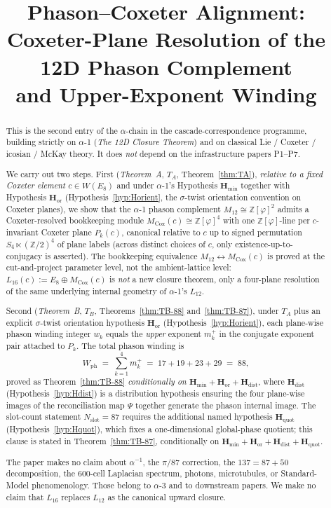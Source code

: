 \documentclass[11pt, a4paper]{amsart}
\title{Phason--Coxeter Alignment:\\
  Coxeter-Plane Resolution of the 12D Phason Complement\\
  and Upper-Exponent Winding}
\author{}
\date{}
\theoremstyle{definition}
\newcommand{\Z}{\mathbb{Z}}
\newcommand{\Hmin}{\mathbf{H}_{\min}}
\newcommand{\Hor}{\mathbf{H}_{\mathrm{or}}}
\newcommand{\Hdist}{\mathbf{H}_{\mathrm{dist}}}
\newcommand{\Hquot}{\mathbf{H}_{\mathrm{quot}}}
\newcommand{\Ophi}{\mathbb{Z}[\varphi]}
\newcommand{\Mcox}{M_{\mathrm{Cox}}}
\newcommand{\Mtw}{M_{12}}
\newcommand{\Wph}{W_{\mathrm{ph}}}
\newcommand{\Nslot}{N_{\mathrm{slot}}}
\begin{document}
\maketitle

\begin{abstract}
This is the second entry of the $\alpha$-chain in the
cascade-correspondence programme, building strictly on
$\alpha$-1 (\emph{The 12D Closure Theorem}) and on classical
Lie / Coxeter / icosian / McKay theory. It does \emph{not}
depend on the infrastructure papers P1--P7.

We carry out two steps. First (\emph{Theorem~A}, $T_A$,
Theorem~\ref{thm:TA}), \emph{relative to a fixed Coxeter
element $c \in W(E_8)$} and under $\alpha$-1's Hypothesis
$\Hmin$ together with Hypothesis $\Hor$
(Hypothesis~\ref{hyp:Horient}, the $\sigma$-twist
orientation convention on Coxeter planes), we show that
the $\alpha$-1 phason complement $\Mtw \cong \Ophi^{2}$
admits a Coxeter-resolved bookkeeping module $\Mcox(c)
\cong \Ophi^{4}$ with one $\Ophi$-line per
$c$-invariant Coxeter plane $P_k(c)$, canonical relative
to $c$ up to signed permutation $S_4 \ltimes (\Z/2)^4$
of plane labels (across distinct choices of $c$, only
existence-up-to-conjugacy is asserted). The bookkeeping
equivalence $\Mtw \leftrightarrow \Mcox(c)$ is proved at
the cut-and-project parameter level, not the
ambient-lattice level: $L_{16}(c) := E_8 \oplus \Mcox(c)$
is \emph{not} a new closure theorem, only a four-plane
resolution of the same underlying internal geometry of
$\alpha$-1's $L_{12}$.

Second (\emph{Theorem~B}, $T_B$, Theorems~\ref{thm:TB-88}
and~\ref{thm:TB-87}), under $T_A$ plus an explicit
$\sigma$-twist orientation hypothesis $\Hor$
(Hypothesis~\ref{hyp:Horient}), each plane-wise phason
winding integer $w_k$ equals the \emph{upper} exponent
$m_k^+$ in the conjugate exponent pair attached to $P_k$.
The total phason winding is
\[
  \Wph \;=\; \sum_{k=1}^{4} m_k^+
        \;=\; 17 + 19 + 23 + 29
        \;=\; 88,
\]
proved as Theorem~\ref{thm:TB-88} \emph{conditionally on
$\Hmin + \Hor + \Hdist$}, where $\Hdist$
(Hypothesis~\ref{hyp:Hdist}) is a distribution hypothesis
ensuring the four plane-wise images of the reconciliation
map $\Psi$ together generate the phason internal image.
The slot-count statement $\Nslot = 87$ requires the
additional named hypothesis $\Hquot$
(Hypothesis~\ref{hyp:Hquot}), which fixes a one-dimensional
global-phase quotient; this clause is stated in
Theorem~\ref{thm:TB-87}, conditionally on $\Hmin + \Hor +
\Hdist + \Hquot$.

The paper makes no claim about $\alpha^{-1}$, the
$\pi/87$ correction, the $137 = 87 + 50$ decomposition,
the $600$-cell Laplacian spectrum, photons, microtubules,
or Standard-Model phenomenology. Those belong to $\alpha$-3
and to downstream papers. We make no claim that
$L_{16}$ replaces $L_{12}$ as the canonical upward closure.
\end{abstract}
\end{document}
